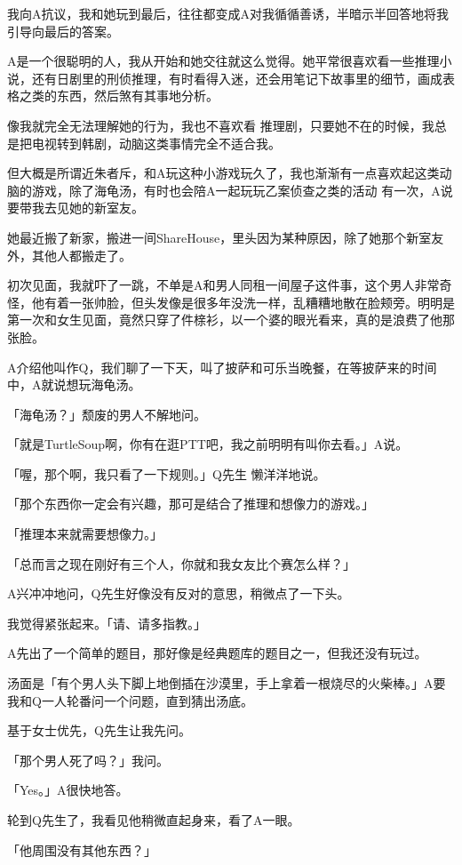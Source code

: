\documentclass{article}
\begin{document}
我向A抗议，我和她玩到最后，往往都变成A对我循循善诱，半暗示半回答地将我引导向最后的答案。 

A是一个很聪明的人，我从开始和她交往就这么觉得。她平常很喜欢看一些推理小说，还有日剧里的刑侦推理，有时看得入迷，还会用笔记下故事里的细节，画成表格之类的东西，然后煞有其事地分析。 

像我就完全无法理解她的行为，我也不喜欢看
\newpage
推理剧，只要她不在的时候，我总是把电视转到韩剧，动脑这类事情完全不适合我。 

但大概是所谓近朱者斥，和A玩这种小游戏玩久了，我也渐渐有一点喜欢起这类动脑的游戏，除了海龟汤，有时也会陪A一起玩玩乙案侦查之类的活动
有一次，A说要带我去见她的新室友。 

她最近搬了新家，搬进一间ShareHouse，里头因为某种原因，除了她那个新室友外，其他人都搬走了。 

初次见面，我就吓了一跳，不单是A和男人同租一间屋子这件事，这个男人非常奇怪，他有着一张帅脸，但头发像是很多年没洗一样，乱糟糟地散在脸颊旁。明明是第一次和女生见面，竟然只穿了件榇衫，以一个婆的眼光看来，真的是浪费了他那张脸。 

A介绍他叫作Q，我们聊了一下天，叫了披萨和可乐当晚餐，在等披萨来的时间中，A就说想玩海龟汤。 

「海龟汤？」颓废的男人不解地问。 

「就是TurtleSoup啊，你有在逛PTT吧，我之前明明有叫你去看。」A说。 

「喔，那个啊，我只看了一下规则。」Q先生
\newpage
懒洋洋地说。 

「那个东西你一定会有兴趣，那可是结合了推理和想像力的游戏。」 

「推理本来就需要想像力。」 

「总而言之现在刚好有三个人，你就和我女友比个赛怎么样？」 

A兴冲冲地问，Q先生好像没有反对的意思，稍微点了一下头。 

我觉得紧张起来。「请、请多指教。」 

A先出了一个简单的题目，那好像是经典题库的题目之一，但我还没有玩过。 

汤面是「有个男人头下脚上地倒插在沙漠里，手上拿着一根烧尽的火柴棒。」A要我和Q一人轮番问一个问题，直到猜出汤底。 

基于女士优先，Q先生让我先问。 

「那个男人死了吗？」我问。 

「Yes。」A很快地答。 

轮到Q先生了，我看见他稍微直起身来，看了A一眼。 

「他周围没有其他东西？」 
\end{document}

